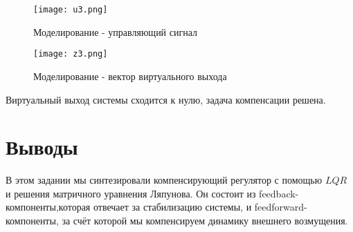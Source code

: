 \begin{figure}[ht]
  \centering
  \texttt{[image: u3.png]}
  \caption{Моделирование - управляющий сигнал}
\end{figure}

\begin{figure}[ht]
  \centering
  \texttt{[image: z3.png]}
  \caption{Моделирование - вектор виртуального выхода}
\end{figure}

Виртуальный выход системы сходится к нулю, задача компенсации решена.

\section{Выводы}

В этом задании мы синтезировали компенсирующий регулятор с помощью $LQR$ и решения матричного уравнения Ляпунова. 
Он состоит из feedback-компоненты,которая отвечает за стабилизацию системы,
и feedforward-компоненты, за счёт которой мы компенсируем динамику внешнего возмущения.

\endinput